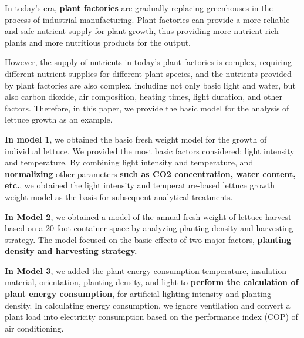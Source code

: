\documentclass[12pt]{article}
\begin{document}




In today's era, \textbf{plant factories} are gradually replacing greenhouses in the process of industrial manufacturing. Plant factories can provide a more reliable and safe nutrient supply for plant growth, thus providing more nutrient-rich plants and more nutritious products for the output.


However, the supply of nutrients in today's plant factories is complex, requiring different nutrient supplies for different plant species, and the nutrients provided by plant factories are also complex, including not only basic light and water, but also carbon dioxide, air composition, heating times, light duration, and other factors. Therefore, in this paper, we provide the basic model for the analysis of lettuce growth as an example.


\textbf{In model 1}, we obtained the basic fresh weight model for the growth of individual lettuce. We provided the most basic factors considered: light intensity and temperature. By combining light intensity and temperature, and \textbf{normalizing} other parameters \textbf{such as CO2 concentration, water content, etc.}, we obtained the light intensity and temperature-based lettuce growth weight model as the basis for subsequent analytical treatments.


\textbf{In Model 2}, we obtained a model of the annual fresh weight of lettuce harvest based on a 20-foot container space by analyzing planting density and harvesting strategy. The model focused on the basic effects of two major factors, \textbf{planting density and harvesting strategy.}


\textbf{In Model 3}, we added the plant energy consumption temperature, insulation material, orientation, planting density, and light to \textbf{perform the calculation of plant energy consumption}, for artificial lighting intensity and planting density. In calculating energy consumption, we ignore ventilation and convert a plant load into electricity consumption based on the performance index (COP) of air conditioning.
\end{document}

